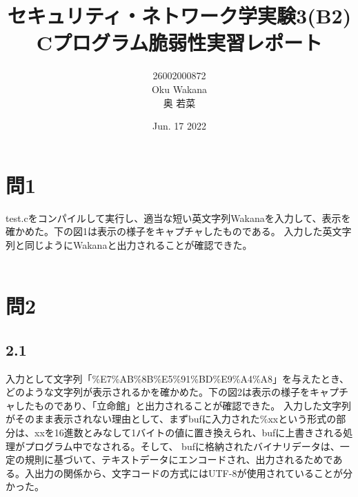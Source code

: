 \documentclass[dvipdfmx,autodetect-engine,titlepage]{jsarticle}
\title{セキュリティ・ネトワーク学実験3(B2)\\
Cプログラム脆弱性実習レポート\\
}
\author{26002000872\\Oku Wakana\\奥 若菜}
\date{Jun. 17 2022}
\begin{document}
\maketitle

\section*{問1}test.cをコンパイルして実行し、適当な短い英文字列Wakanaを入力して、表示を確かめた。下の図1は表示の様子をキャプチャしたものである。
入力した英文字列と同じようにWakanaと出力されることが確認できた。\\\\

\begin{figure}[H]
  \centering
  \caption{}\label{fig:図1}
\end{figure}

\section*{問2}
\subsection*{2.1}
入力として文字列「\%E7\%AB\%8B\%E5\%91\%BD\%E9\%A4\%A8」を与えたとき、どのような文字列が表示されるかを確かめた。下の図2は表示の様子をキャプチャしたものであり、「立命館」と出力されることが確認できた。
入力した文字列がそのまま表示されない理由として、まずbufに入力された\%xxという形式の部分は、xxを16進数とみなして1バイトの値に置き換えられ、bufに上書きされる処理がプログラム中でなされる。そして、
bufに格納されたバイナリデータは、一定の規則に基づいて、テキストデータにエンコードされ、出力されるためである。入出力の関係から、文字コードの方式にはUTF-8が使用されていることが分かった。\\\\
\end{document}
